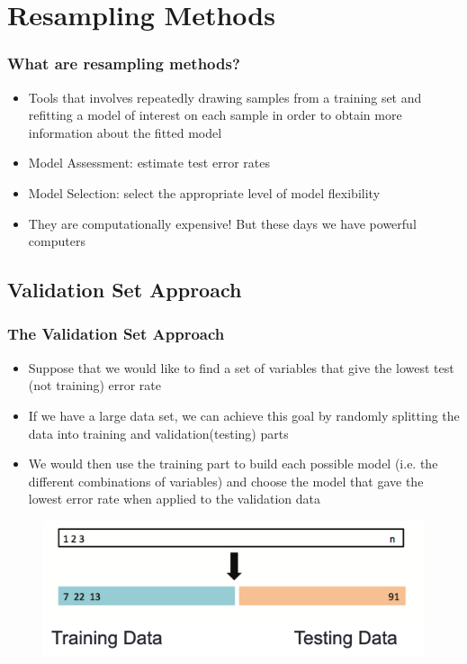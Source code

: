 \documentclass[
  shownotes,
  xcolor={svgnames},
  hyperref={colorlinks,citecolor=DarkBlue,linkcolor=DarkRed,urlcolor=DarkBlue}
  , aspectratio=169]{beamer}
\begin{document}
\section{Resampling Methods}
\begin{frame}[fragile]
\frametitle{What are resampling methods?}

\begin{itemize}
\item Tools that involves repeatedly drawing samples from a training set and refitting a model of interest on each sample in order to obtain more information about the fitted model
\medskip
\item Model Assessment: estimate test error rates 
\medskip
\item Model Selection: select the appropriate level of model flexibility
\medskip
\item They are computationally expensive! But these days we have powerful computers

\end{itemize}




\end{frame}
\subsection{Validation Set Approach}
\begin{frame}[fragile]
\frametitle{The Validation Set Approach}

\begin{itemize}
\item Suppose that we would like to find a set of variables that give the lowest test (not training) error rate
\item If we have a large data set, we can achieve this goal by randomly splitting the data into training and validation(testing) parts
\item We would then use the training part to build each possible model (i.e. the different combinations of variables) and choose the model that gave the lowest error rate when applied to the validation data
\end{itemize}

       \begin{figure}[H] \centering
            \captionsetup{justification=centering}
              \includegraphics[scale=0.4]{figures/fig51.png}
       \end{figure}

\end{frame}
\end{document}
